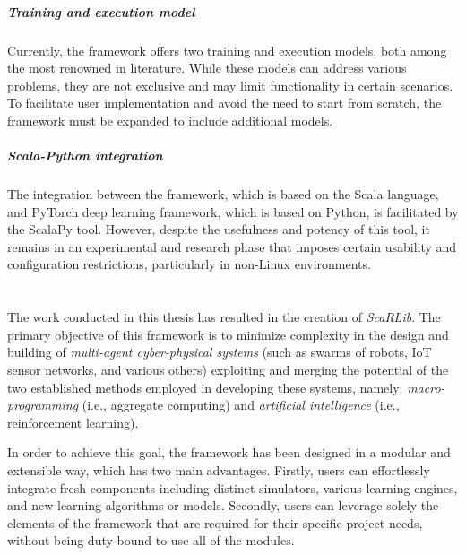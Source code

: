 \documentclass[12pt,a4paper,openright,twoside]{book}
\begin{document}
\paragraph{Training and execution model} 
Currently, the framework offers two training and execution models, both among the most renowned in literature. 
    While these models can address various problems, they are not exclusive and may limit functionality in certain scenarios. 
    To facilitate user implementation and avoid the need to start from scratch, the framework must be expanded 
    to include additional models.

\paragraph{Scala-Python integration}
The integration between the framework, which is based on the Scala language, and PyTorch deep learning framework, 
    which is based on Python, is facilitated by the ScalaPy tool. However, despite the usefulness and potency of this tool, 
    it remains in an experimental and research phase that imposes certain usability and configuration restrictions, particularly 
    in non-Linux environments.

\chapter{\conclusionsname}
\label{chap:conclusions}
The work conducted in this thesis has resulted in the creation of \emph{ScaRLib}. The primary objective of this framework is to minimize complexity 
    in the design and building of \emph{multi-agent cyber-physical systems} (such as swarms of robots, IoT sensor networks, and various others) 
    exploiting and merging the potential of the two established methods employed in developing these systems, 
    namely: \emph{macro-programming} (i.e., aggregate computing) and \emph{artificial intelligence} (i.e., reinforcement learning).

In order to achieve this goal, the framework has been designed in a modular and extensible way, which has two main advantages.
    Firstly, users can effortlessly integrate fresh components including distinct simulators, various learning engines, and new learning algorithms or models.
    Secondly, users can leverage solely the elements of the framework that are required for their 
    specific project needs, without being duty-bound to use all of the modules.
\end{document}
